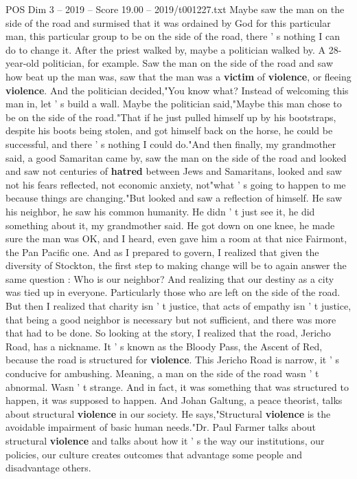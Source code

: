 \begin{textsample}{POS Dim 3 – 2019 – Score 19.00 – 2019/t001227.txt}
Maybe saw the man on the side of the road and surmised that it was ordained by God for this particular man, this particular group to be on the side of the road, there ' s nothing I can do to change it.
After the priest walked by, maybe a politician walked by.
A 28-year-old politician, for example.
Saw the man on the side of the road and saw how beat up the man was, saw that the man was a \textbf{victim} of \textbf{violence}, or fleeing \textbf{violence}.
And the politician decided,"You know what?
Instead of welcoming this man in, let ' s build a wall.
Maybe the politician said,"Maybe this man chose to be on the side of the road."That if he just pulled himself up by his bootstraps, despite his boots being stolen, and got himself back on the horse, he could be successful, and there ' s nothing I could do."And then finally, my grandmother said, a good Samaritan came by, saw the man on the side of the road and looked and saw not centuries of \textbf{hatred} between Jews and Samaritans, looked and saw not his fears reflected, not economic anxiety, not"what ' s going to happen to me because things are changing."But looked and saw a reflection of himself.
He saw his neighbor, he saw his common humanity.
He didn ' t just see it, he did something about it, my grandmother said.
He got down on one knee, he made sure the man was OK, and I heard, even gave him a room at that nice Fairmont, the Pan Pacific one.
And as I prepared to govern, I realized that given the diversity of Stockton, the first step to making change will be to again answer the same question : Who is our neighbor?
And realizing that our destiny as a city was tied up in everyone.
Particularly those who are left on the side of the road.
But then I realized that charity isn ' t justice, that acts of empathy isn ' t justice, that being a good neighbor is necessary but not sufficient, and there was more that had to be done.
So looking at the story, I realized that the road, Jericho Road, has a nickname.
It ' s known as the Bloody Pass, the Ascent of Red, because the road is structured for \textbf{violence}.
This Jericho Road is narrow, it ' s conducive for ambushing.
Meaning, a man on the side of the road wasn ' t abnormal.
Wasn ' t strange.
And in fact, it was something that was structured to happen, it was supposed to happen.
And Johan Galtung, a peace theorist, talks about structural \textbf{violence} in our society.
He says,"Structural \textbf{violence} is the avoidable impairment of basic human needs."Dr.
Paul Farmer talks about structural \textbf{violence} and talks about how it ' s the way our institutions, our policies, our culture creates outcomes that advantage some people and disadvantage others.

\end{textsample}
